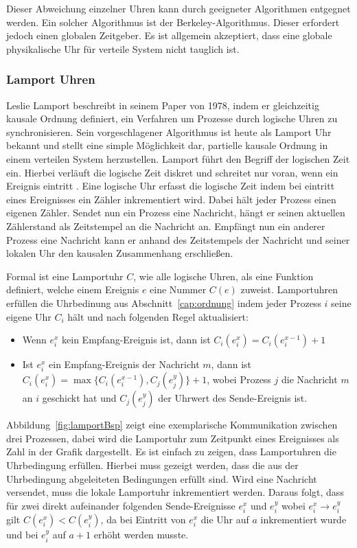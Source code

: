 Dieser Abweichung einzelner Uhren kann durch geeigneter Algorithmen entgegnet werden.
Ein solcher Algorithmus ist der Berkeley-Algorithmus. Dieser erfordert jedoch einen globalen Zeitgeber.
Es ist allgemein akzeptiert, dass eine globale physikalische Uhr für verteile System nicht tauglich ist. %

\subsubsection{Lamport Uhren}
\label{cap:vectorclock}
Leslie Lamport beschreibt in seinem Paper \cite{Lamport1978} von 1978, indem er gleichzeitig kausale Ordnung definiert, ein Verfahren um Prozesse durch logische Uhren zu synchronisieren.
Sein vorgeschlagener Algorithmus ist heute als Lamport Uhr bekannt und stellt eine simple Möglichkeit dar, partielle kausale Ordnung in einem verteilen System herzustellen.
Lamport führt den Begriff der logischen Zeit ein.
Hierbei verläuft die logische Zeit diskret und schreitet nur voran, wenn ein Ereignis eintritt \cite{leon2013ereignisdiskrete}.
Eine logische Uhr erfasst die logische Zeit indem bei eintritt eines Ereignisses ein Zähler inkrementiert wird.
Dabei hält jeder Prozess einen eigenen Zähler.
Sendet nun ein Prozess eine Nachricht, hängt er seinen aktuellen Zählerstand als Zeitstempel an die Nachricht an.
Empfängt nun ein anderer Prozess eine Nachricht kann er anhand des Zeitstempels der Nachricht und seiner lokalen Uhr den kausalen Zusammenhang erschließen.

Formal ist eine Lamportuhr $C$, wie alle logische Uhren, als eine Funktion definiert, welche einem Ereignis $e$ eine Nummer $C(e)$ zuweist.
Lamportuhren erfüllen die Uhrbedinung aus Abschnitt~\ref{cap:ordnung} indem jeder Prozess $i$ seine eigene Uhr $C_i$ hält und nach folgenden Regel aktualisiert:
\begin{itemize}
    \item Wenn $e_i^x$ kein Empfang-Ereignis ist, dann ist $C_i(e_i^x)=C_i(e_i^{x-1})+1$
    \item Ist $e_i^x$ ein Empfang-Ereignis der Nachricht $m$, dann ist $C_i(e_i^x)=\max\{C_i(e_i^{x-1}), C_j(e_j^y)  \} + 1$, wobei Prozess $j$ die Nachricht $m$ an $i$ geschickt hat und $C_j(e_j^y)$ der Uhrwert des Sende-Ereignis ist.
\end{itemize}

Abbildung~\ref{fig:lamportBsp} zeigt eine exemplarische Kommunikation zwischen drei Prozessen, dabei wird die Lamportuhr zum Zeitpunkt eines Ereignisses als Zahl in der Grafik dargestellt.
Es ist einfach zu zeigen, dass Lamportuhren die Uhrbedingung erfüllen.
Hierbei muss gezeigt werden, dass die aus der Uhrbedingung abgeleiteten Bedingungen erfüllt sind.
Wird eine Nachricht versendet, muss die lokale Lamportuhr inkrementiert werden. 
Daraus folgt, dass für zwei direkt aufeinander folgenden Sende-Ereignisse $e_i^x$ und $e_i^y$ wobei $e_i^x \rightarrow e_i^y$ gilt $C(e_i^x) < C(e_i^y)$, da bei Eintritt von $e_i^x$ die Uhr auf $a$ inkrementiert wurde und bei $e_i^y$ auf $a + 1$ erhöht werden musste.

